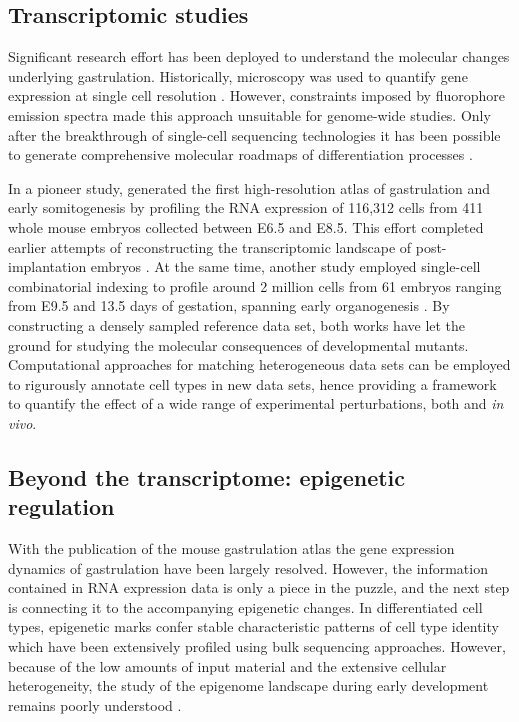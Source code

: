 \subsection{Transcriptomic studies}
Significant research effort has been deployed to understand the molecular changes underlying gastrulation. Historically, microscopy was used to quantify gene expression at single cell resolution \cite{XX}. However, constraints imposed by fluorophore emission spectra made this approach unsuitable for genome-wide studies. Only after the breakthrough of single-cell sequencing technologies it has been possible to generate comprehensive molecular roadmaps of differentiation processes \cite{Schaum2018,PijuanSala2019,Cao2019,Regev2018}.

In a pioneer study, \cite{PijuanSala2019} generated the first high-resolution atlas of gastrulation and early somitogenesis by profiling the RNA expression of 116,312 cells from 411 whole mouse embryos collected between E6.5 and E8.5. This effort completed earlier attempts of reconstructing the transcriptomic landscape of post-implantation embryos \cite{Mohammed2017,Scialdone2016,Ibarra-Soria2018,Wen2017}. At the same time, another study employed single-cell combinatorial indexing to profile around 2 million cells from 61 embryos ranging from E9.5 and 13.5 days of gestation, spanning early organogenesis \cite{Cao2019}. By constructing a densely sampled reference data set, both works have let the ground for studying the molecular consequences of developmental mutants.
Computational approaches for matching heterogeneous data sets \cite{Haghverdi2018,Stuart2019} can be employed to rigurously annotate cell types in new data sets, hence providing a framework to quantify the effect of a wide range of experimental perturbations, both  and \textit{in vivo}.



\subsection{Beyond the transcriptome: epigenetic regulation}

With the publication of the mouse gastrulation atlas the gene expression dynamics of gastrulation have been largely resolved. However, the information contained in RNA expression data is only a piece in the puzzle, and the next step is connecting it to the accompanying epigenetic changes. In differentiated cell types, epigenetic marks confer stable characteristic patterns of cell type identity which have been extensively profiled using bulk sequencing approaches. However, because of the low amounts of input material and the extensive cellular heterogeneity, the study of the epigenome landscape during early development remains poorly understood \cite{Kelsey2017}.

